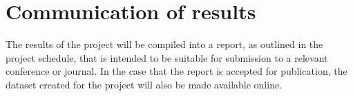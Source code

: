\documentclass[11pt]{scrartcl}
\begin{document}
    \section{Communication of results} {

        The results of the project will be compiled into a report, as outlined
        in the project schedule, that is intended to be suitable for
        submission to a relevant conference or journal. In the case that the
        report is accepted for publication, the dataset created for the
        project will also be made available online.
        
    }

	
	
\end{document}
